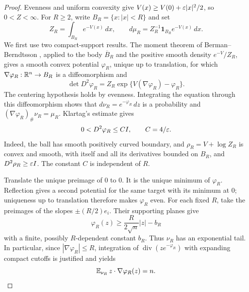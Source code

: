 \begin{proof}
Evenness and uniform convexity give
$V(x)\ge V(0)+\varepsilon|x|^2/2$, so $0<Z<\infty$.
For $R\ge2$, write $B_R=\{x:|x|<R\}$ and set
\[
 Z_R=\int_{B_R}e^{-V(x)}\,dx,
 \qquad d\mu_R=Z_R^{-1}\mathbf1_{B_R}e^{-V(x)}\,dx.
\]
We first use two compact-support results.  The moment theorem of
Berman--Berndtsson \cite[Theorem~1.1]{BermanBerndtsson2013}, applied to
the body $\overline B_R$ and the positive smooth density
$e^{-V}/Z_R$, gives a smooth convex potential $\varphi_R$, unique up to
translation, for which $\nabla\varphi_R:\mathbb R^n\to B_R$ is a
diffeomorphism and
\begin{equation}\label{eq:moment-truncated}
 \det D^2\varphi_R
   =Z_R\exp\{V(\nabla\varphi_R)-\varphi_R\}.
\end{equation}
The centering hypothesis holds by evenness.  Integrating the equation
through this diffeomorphism shows that
$d\nu_R=e^{-\varphi_R}\,dz$ is a probability and
$(\nabla\varphi_R)_\#\nu_R=\mu_R$.
Klartag's estimate \cite[Proposition~3.1 and Remark~3.5]{KlartagArxiv2013}
gives
\[
 0<D^2\varphi_R\le CI,\qquad C=4/\varepsilon.
\]
Indeed, the ball has smooth positively curved boundary, and
$\rho_R=V+\log Z_R$ is convex and smooth, with itself and all its
derivatives bounded on $B_R$, and $D^2\rho_R\ge\varepsilon I$.
The constant $C$ is independent of $R$.

Translate the unique preimage of $0$ to $0$.  It is the unique minimum
of $\varphi_R$.  Reflection gives a second potential for the same
target with its minimum at $0$; uniqueness up to translation therefore
makes $\varphi_R$ even.  For each fixed $R$, take the preimages of
the slopes $\pm(R/2)e_i$.  Their supporting planes give
\[
 \varphi_R(z)\ge\frac{R}{2\sqrt n}|z|-b_R
\]
with a finite, possibly $R$-dependent constant $b_R$.
Thus $\nu_R$ has an exponential tail.  In particular, since
$|\nabla\varphi_R|\le R$, integration of
$\operatorname{div}(z e^{-\varphi_R})$ with expanding compact cutoffs
is justified and yields
\begin{equation}\label{eq:moment-source-identity}
 \mathbb E_{\nu_R}\,z\cdot\nabla\varphi_R(z)=n.
\end{equation}


\end{proof}
